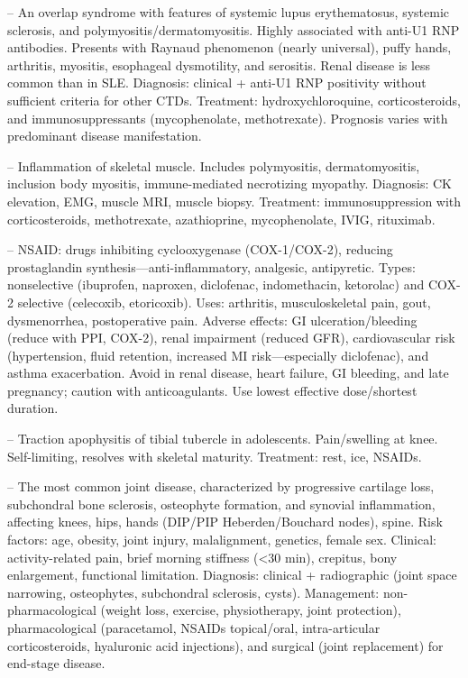 -- An overlap syndrome with features of systemic lupus erythematosus, systemic sclerosis, and polymyositis/dermatomyositis. Highly associated with anti-U1 RNP antibodies. Presents with Raynaud phenomenon (nearly universal), puffy hands, arthritis, myositis, esophageal dysmotility, and serositis. Renal disease is less common than in SLE. Diagnosis: clinical + anti-U1 RNP positivity without sufficient criteria for other CTDs. Treatment: hydroxychloroquine, corticosteroids, and immunosuppressants (mycophenolate, methotrexate). Prognosis varies with predominant disease manifestation.

-- Inflammation of skeletal muscle. Includes polymyositis, dermatomyositis, inclusion body myositis, immune-mediated necrotizing myopathy. Diagnosis: CK elevation, EMG, muscle MRI, muscle biopsy. Treatment: immunosuppression with corticosteroids, methotrexate, azathioprine, mycophenolate, IVIG, rituximab.

-- NSAID: drugs inhibiting cyclooxygenase (COX-1/COX-2), reducing prostaglandin synthesis—anti-inflammatory, analgesic, antipyretic. Types: nonselective (ibuprofen, naproxen, diclofenac, indomethacin, ketorolac) and COX-2 selective (celecoxib, etoricoxib). Uses: arthritis, musculoskeletal pain, gout, dysmenorrhea, postoperative pain. Adverse effects: GI ulceration/bleeding (reduce with PPI, COX-2), renal impairment (reduced GFR), cardiovascular risk (hypertension, fluid retention, increased MI risk—especially diclofenac), and asthma exacerbation. Avoid in renal disease, heart failure, GI bleeding, and late pregnancy; caution with anticoagulants. Use lowest effective dose/shortest duration.

-- Traction apophysitis of tibial tubercle in adolescents. Pain/swelling at knee. Self-limiting, resolves with skeletal maturity. Treatment: rest, ice, NSAIDs.

-- The most common joint disease, characterized by progressive cartilage loss, subchondral bone sclerosis, osteophyte formation, and synovial inflammation, affecting knees, hips, hands (DIP/PIP Heberden/Bouchard nodes), spine. Risk factors: age, obesity, joint injury, malalignment, genetics, female sex. Clinical: activity-related pain, brief morning stiffness (<30 min), crepitus, bony enlargement, functional limitation. Diagnosis: clinical + radiographic (joint space narrowing, osteophytes, subchondral sclerosis, cysts). Management: non-pharmacological (weight loss, exercise, physiotherapy, joint protection), pharmacological (paracetamol, NSAIDs topical/oral, intra-articular corticosteroids, hyaluronic acid injections), and surgical (joint replacement) for end-stage disease.


